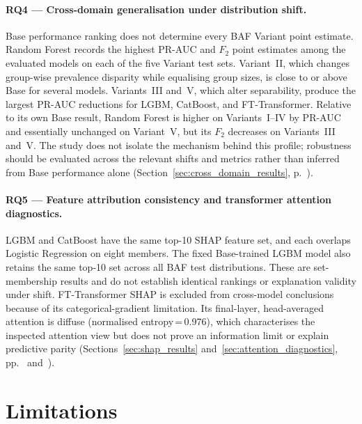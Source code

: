\paragraph{RQ4 — Cross-domain generalisation under distribution shift.}
Base performance ranking does not determine every BAF Variant point estimate. Random Forest records the highest PR-AUC and $F_2$ point estimates among the evaluated models on each of the five Variant test sets. Variant~II, which changes group-wise prevalence disparity while equalising group sizes, is close to or above Base for several models. Variants~III and~V, which alter separability, produce the largest PR-AUC reductions for LGBM, CatBoost, and FT-Transformer. Relative to its own Base result, Random Forest is higher on Variants~I--IV by PR-AUC and essentially unchanged on Variant~V, but its $F_2$ decreases on Variants~III and~V. The study does not isolate the mechanism behind this profile; robustness should be evaluated across the relevant shifts and metrics rather than inferred from Base performance alone (Section~\ref{sec:cross_domain_results}, p.~\pageref{sec:cross_domain_results}).

\paragraph{RQ5 — Feature attribution consistency and transformer attention diagnostics.}
LGBM and CatBoost have the same top-10 SHAP feature set, and each overlaps Logistic Regression on eight members. The fixed Base-trained LGBM model also retains the same top-10 set across all BAF test distributions. These are set-membership results and do not establish identical rankings or explanation validity under shift. FT-Transformer SHAP is excluded from cross-model conclusions because of its categorical-gradient limitation. Its final-layer, head-averaged attention is diffuse (normalised entropy\,=\,0.976), which characterises the inspected attention view but does not prove an information limit or explain predictive parity (Sections~\ref{sec:shap_results} and~\ref{sec:attention_diagnostics}, pp.~\pageref{sec:shap_results} and~\pageref{sec:attention_diagnostics}).

\section{Limitations}
\label{sec:limitations}

